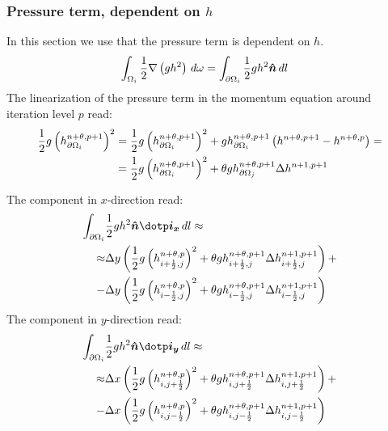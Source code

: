 \subsubsection{Pressure term, dependent on $h$}
In this section we use that the pressure term is dependent on $h$.
\begin{align}
    \int_{\Omega_i} \frac{1}{2}  \nabla \left( g h^2\right) \, d\omega & =
    \int_{\partial\Omega_i} \frac{1}{2}  g h^2 \mbox{\boldmath $\hat n$}\, dl \label{eq:2d_press_term}
\end{align}
The linearization of the pressure term in the momentum equation around iteration level $p$ read:
\begin{align}
    \frac{1}{2} g \left(h^{n+\theta,p+1}_{\partial\Omega_i}\right)^2  & =
    \frac{1}{2} g \left(h^{n+\theta,p+1}_{\partial\Omega_i}\right)^2
    + g h^{n+\theta,p+1}_{\partial\Omega_i} \left({h}^{n+\theta,p+1} - {h}^{n+\theta,p}\right) =
    \\
    & = \frac{1}{2} g \left(h^{n+\theta,p+1}_{\partial\Omega_i}\right)^2 + \theta  g h^{n+\theta,p+1}_{\partial\Omega_j} \Delta {h}^{n+1,p+1}
\end{align}

The component in $x$-direction read:
\begin{align}
    \int_{\partial\Omega_i} & \half  g h^2 \vec{\hat n} \dotp \vec{i_x}\, dl \approx
    \nonumber \\
    \approx  & \Dy \left( \half g \left(h^{n+\theta,p}_{i+\half,j}\right)^2 + \theta  g h^{n+\theta,p+1}_{i+\half,j} \Delta {h}^{n+1,p+1}_{i+\half,j}  \right) +
    \nonumber \\
    - & \Dy \left( \half g \left(h^{n+\theta,p}_{i-\half,j}\right)^2 + \theta  g h^{n+\theta,p+1}_{i-\half,j} \Delta {h}^{n+1,p+1}_{i-\half,j}  \right)
\end{align}
The component in $y$-direction read:
\begin{align}
    \int_{\partial\Omega_i} & \half  g h^2 \vec{\hat n} \dotp \vec{i_y}\, dl \approx
    \nonumber \\
    \approx  & \Dx \left( \half g \left(h^{n+\theta,p}_{i,j+\half}\right)^2 + \theta  g h^{n+\theta,p+1}_{i,j+\half} \Delta {h}^{n+1,p+1}_{i,j+\half}  \right) +
    \nonumber \\
    - & \Dx \left( \half g \left(h^{n+\theta,p}_{i,j-\half}\right)^2 + \theta  g h^{n+\theta,p+1}_{i,j-\half} \Delta {h}^{n+1,p+1}_{i,j-\half}  \right)
\end{align}

